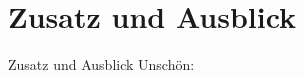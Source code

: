 \section{Zusatz und Ausblick}
\begin{frame}[fragile]{Zusatz und Ausblick}
	Unschön:
	
\end{frame}




